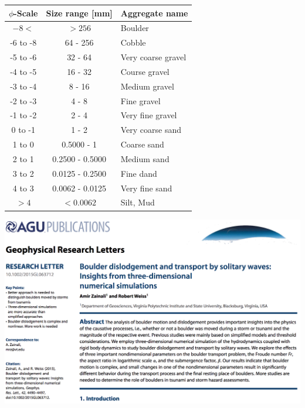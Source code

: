 \documentclass{beamer}
\begin{document}
\begin{frame}[c]%
  \begin{center}
  \begin{tabular}{ccl}
      \toprule
    $\phi$-Scale & Size range [mm] & Aggregate name \\ \hline
      $-8<$          & $>256$            & Boulder   \\ \hline
    -6 to -8        & 64 - 256          & Cobble     \\ \hline
    -5 to -6        & 32 - 64           & Very coarse gravel \\
    -4 to -5        & 16 - 32           & Course gravel \\
    -3 to -4        & 8 - 16            & Medium gravel \\
    -2 to -3        & 4 - 8             & Fine gravel \\
  -1 to -2        & 2 - 4             & Very fine gravel \\ \hline
    0 to -1        & 1 - 2             &Very coarse sand \\
   1 to 0         & 0.5000 - 1           & Coarse sand \\
     2 to 1         &0.2500 - 0.5000        & Medium sand \\
    3 to 2         & 0.0125 - 0.2500         & Fine dand \\
    4 to 3         & 0.0062 - 0.0125   & Very fine sand \\ \hline
    $>4$             &$< 0.0062$        &Silt, Mud\\
    \bottomrule
\end{tabular}
\end{center}
\end{frame}

\begin{frame}[c]
  \begin{center}
    {\includegraphics[scale=0.20]{threeDboulder1t.png}}
  \end{center}
\end{frame}
\end{document}

